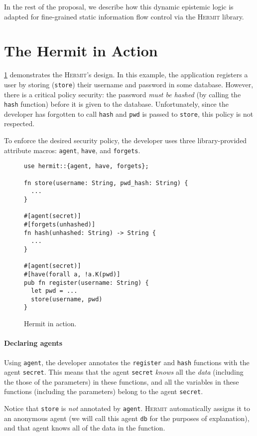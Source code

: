 \documentclass[letterpaper,twocolumn,10pt]{article}
\newcommand{\Hermit}{\textsc{Hermit}}
\begin{document}
In the rest of the proposal, we describe how this dynamic epistemic logic is adapted for
fine-grained static information flow control via the \Hermit{} library.

\section{The Hermit in Action}

\cref{fig:example} demonstrates the \Hermit's design. In this example, the application registers a
user by storing (\lstinline{store}) their username and password in some database. However, there is
a critical policy security: the password \emph{must be hashed} (by calling the \lstinline{hash}
function) before it is given to the database. Unfortunately, since the developer has forgotten to
call \lstinline{hash} and \lstinline{pwd} is passed to \lstinline{store}, this policy is not
respected.

To enforce the desired security policy, the developer uses three library-provided attribute macros:
\lstinline{agent}, \lstinline{have}, and \lstinline{forgets}.

\begin{figure}
  \centering
  \begin{lstlisting}
use hermit::{agent, have, forgets};

fn store(username: String, pwd_hash: String) {
  ...
}

#[agent(secret)]
#[forgets(unhashed)]
fn hash(unhashed: String) -> String {
  ...
}

#[agent(secret)]
#[have(forall a, !a.K(pwd)]
pub fn register(username: String) {
  let pwd = ...
  store(username, pwd)
}
  \end{lstlisting}
  \caption{Hermit in action.}
  \label{fig:example}
\end{figure}

\paragraph{Declaring agents}
Using \lstinline{agent}, the developer annotates the \lstinline{register} and \lstinline{hash}
functions with the agent \lstinline{secret}. This means that the agent \lstinline{secret}
\emph{knows} all the \emph{data} (including the those of the parameters) in these functions, and all
the variables in these functions (including the parameters) belong to the agent \lstinline{secret}.

Notice that \lstinline{store} is \emph{not} annotated by \lstinline{agent}. \Hermit{} automatically
assigns it to an anonymous agent (we will call this agent \lstinline{db} for the purposes of
explanation), and that agent knows all of the data in the function.
\end{document}

